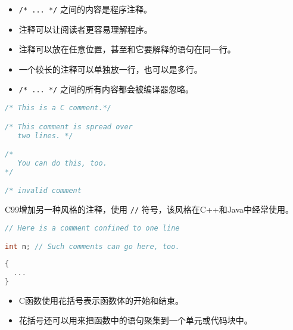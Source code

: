 \begin{frame}
 

 


\begin{overprint}
\begin{itemize}
\item \lstinline|/* ... */| 之间的内容是程序注释。\\[0.1in]
\item 注释可以让阅读者更容易理解程序。\\[0.1in]
\item 注释可以放在任意位置，甚至和它要解释的语句在同一行。\\[0.1in]
\item 一个较长的注释可以单独放一行，也可以是多行。\\[0.1in]
\item \lstinline|/* ... */| 之间的所有内容都会被编译器忽略。
\end{itemize}
\end{overprint}

\end{frame}

\begin{frame}[fragile]
\begin{lstlisting}[language=c]
/* This is a C comment.*/

/* This comment is spread over
   two lines. */

/*
   You can do this, too.
*/

/* invalid comment
\end{lstlisting}
\end{frame}

\begin{frame}[fragile]
C99增加另一种风格的注释，使用 \lstinline|//| 符号，该风格在C++和Java中经常使用。 \vspace{0.2in}


\begin{lstlisting}[language=c]
// Here is a comment confined to one line

int n; // Such comments can go here, too.
\end{lstlisting}
\end{frame}

\begin{frame}[fragile]
 
\begin{lstlisting}[language=c,frame=none]
{
  ...
}
\end{lstlisting}
 
\begin{itemize}
\item
C函数使用花括号表示函数体的开始和结束。\\[0.2in]
\item
花括号还可以用来把函数中的语句聚集到一个单元或代码块中。
\end{itemize}
\end{frame}

